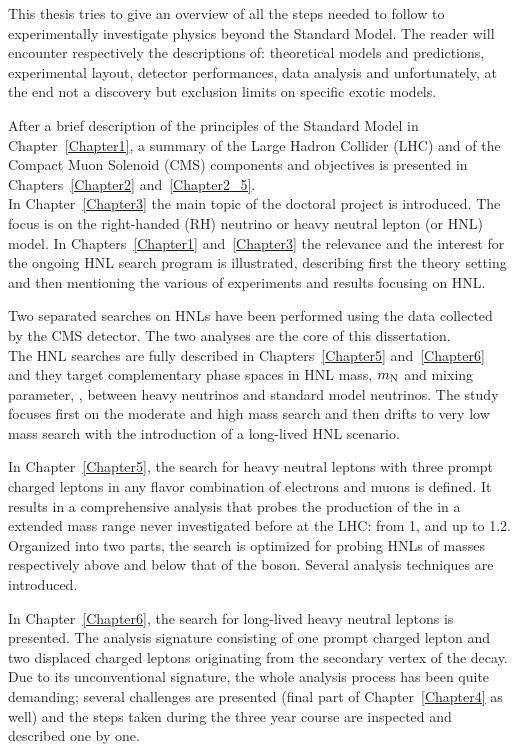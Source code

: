 This thesis tries to give an overview of all the steps needed to follow
to experimentally investigate physics
beyond the Standard Model. The reader will encounter respectively the
descriptions of: theoretical models and predictions, experimental
layout, detector performances, data analysis and unfortunately, at the
end not a discovery but exclusion limits on specific exotic models.

After a brief description of the principles of the Standard Model in
Chapter~\ref{Chapter1}, a summary of the Large Hadron Collider (LHC)
and of the Compact Muon Solenoid (CMS) components and objectives is
presented in Chapters~\ref{Chapter2} and~\ref{Chapter2_5}.\\
In Chapter~\ref{Chapter3} the main topic of the doctoral project is
introduced. The focus is on the right-handed (RH) neutrino or heavy
neutral lepton (\hnl or HNL)
model. In Chapters~\ref{Chapter1} and~\ref{Chapter3} 
the relevance and the interest for the
ongoing HNL search program is illustrated, describing first the theory setting 
and then mentioning the various of experiments and results
focusing on HNL.

Two separated searches on HNLs have been performed using the data
collected by the CMS detector. The two analyses are the core of this
dissertation.\\
The HNL searches are fully described in Chapters~\ref{Chapter5}
and~\ref{Chapter6} and they target complementary phase spaces in HNL mass, $m_\mathrm{N}$
and mixing parameter, \mixpar, between heavy neutrinos and standard
model neutrinos. The study focuses first on the
moderate and high mass search and then drifts to very low mass search with
the introduction of a long-lived HNL scenario.

In Chapter~\ref{Chapter5}, the search for heavy neutral leptons with three
prompt charged leptons in any flavor combination of electrons and
muons is defined. It results in a comprehensive analysis that probes the production of the
\hnl in a extended mass range never investigated before at the LHC:
from 1\GeV, and up to 1.2\TeV. 
Organized into two parts, the search is optimized for
probing HNLs of masses respectively above and below that of the \PW
boson. Several analysis techniques are introduced.

In Chapter~\ref{Chapter6}, the search for long-lived heavy neutral
leptons is presented. The analysis signature
consisting of one prompt charged lepton and two displaced
charged leptons originating from the secondary vertex of the \hnl
decay. Due to its unconventional signature, the whole analysis process has been
quite demanding; several challenges are presented (final part of
Chapter~\ref{Chapter4} as well) and the steps taken during the three
year course are inspected and described one by one.

